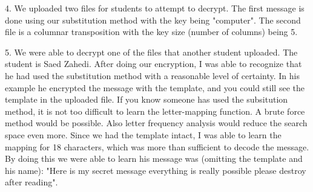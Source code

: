 \documentclass[]{apa}
\begin{document}
4. We uploaded two files for students to attempt to decrypt. The first message is done using our substitution method with the key being "computer". The second file is a columnar transposition with the key size (number of columns) being 5. 

5. We were able to decrypt one of the files that another student uploaded. The student is Saed Zahedi. After doing our encryption, I was able to recognize that he had used the substitution method with a reasonable level of certainty. In his example he encrypted the message with the template, and you could still see the template in the uploaded file. If you know someone has used the subsitution method, it is not too difficult to learn the letter-mapping function. A brute force method would be possible. Also letter frequency analysis would reduce the search space even more. Since we had the template intact, I was able to learn the mapping for 18 characters, which was more than sufficient to decode the message. By doing this we were able to learn his message was (omitting the template and his name): "Here is my secret message   everything is really possible  please destroy after reading".
\end{document}
